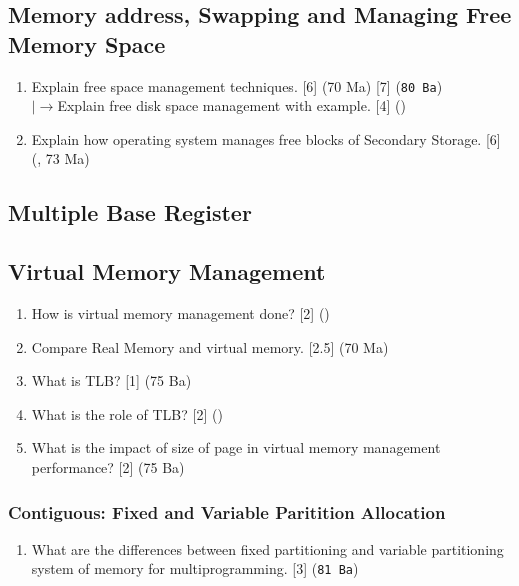 \documentclass[12pt]{article}
\newcommand{\lb}{\\$\left|\rightarrow\right.$}
\begin{document}
	\subsection{Memory address, Swapping and Managing Free Memory Space}
		\begin{enumerate}[noitemsep, topsep=0pt]
			\item Explain free space management techniques. \hfill [6] (70 Ma) [7] (\texttt{80 Ba})
			\lb Explain free disk space management with example. \hfill [4] ()

			\item Explain how operating system manages free blocks of Secondary Storage. \hfill [6] (, 73 Ma)
		\end{enumerate}
		
	\subsection{Multiple Base Register}
	\subsection{Virtual Memory Management}
		\begin{enumerate}[noitemsep, topsep=0pt]
			\item How is virtual memory management done? \hfill [2] ()

			\item Compare Real Memory and virtual memory. \hfill [2.5] (70 Ma)
			
			\item What is TLB? \hfill [1] (75 Ba)
			
			\item What is the role of TLB? \hfill [2] ()

			\item What is the impact of size of page in virtual memory management performance? \hfill [2] (75 Ba)
		\end{enumerate}

		\subsubsection{Contiguous: Fixed and Variable Paritition Allocation}
			\begin{enumerate}[noitemsep, topsep=0pt]
				\item What are the differences between fixed partitioning and variable partitioning system of memory for multiprogramming. \hfill [3] (\texttt{81 Ba})
			\end{enumerate}
\end{document}
